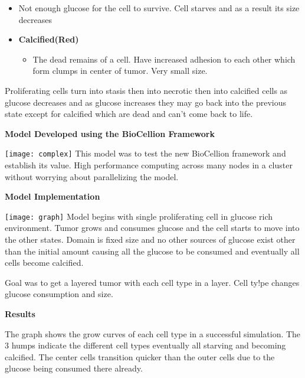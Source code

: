 \documentclass{article}
\newcommand\tab[1][1cm]{\hspace*{#1}}
\begin{document}
\begin{multicols}{2}
\begin{itemize}
         \begin{itemize}
            \item Not enough glucose for the cell to survive.  Cell starves and as a result its size decreases
         \end{itemize}
      \end{itemize}
      \begin{itemize}
         \item \textbf{Calcified(Red)}
         \begin{itemize}
            \item The dead remains of a cell.  Have increased adhesion to each other which form clumps in center of tumor.  Very small size.
         \end{itemize}
      \end{itemize}
      Proliferating cells turn into stasis then into necrotic then into calcified cells as glucose decreases and as glucose increases they may go back into the previous state except for calcified which are dead and can't come back to life.
      \begin{center}\large\textbf{Model Developed using the BioCellion Framework}\end{center}
      \texttt{[image: complex]} %
      \scriptsize
      This model was to test the new BioCellion framework and establish its value.  High performance computing across many nodes in a cluster without worrying about parallelizing the model.
      \begin{center}\large\textbf{Model Implementation}\end{center}
      \texttt{[image: graph]} %
      \tab Model begins with single proliferating cell in glucose rich environment.  Tumor grows and consumes glucose and the cell starts to move into the other states.  Domain is fixed size and no other sources of glucose exist other than the initial amount causing all the glucose to be consumed and eventually all cells become calcified.

      \tab Goal was to get a layered tumor with each cell type in a layer.  Cell ty!pe changes glucose consumption and size.
      \begin{center}\large\textbf{Results}\end{center}
      \tab The graph shows the grow curves of each cell type in a successful simulation.  The 3 humps indicate the different cell types eventually all starving and becoming calcified.  The center cells transition quicker than the outer cells due to the glucose being consumed there already.


\end{multicols}
\end{document}
